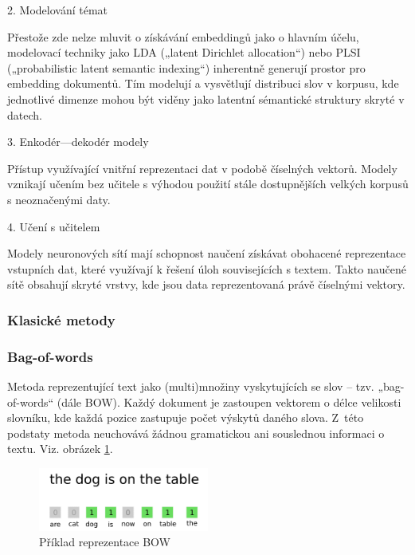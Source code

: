 \documentclass[thesis=M,czech]{FITthesis}[2019/12/23]
\begin{document}
2.	Modelování témat

Přestože zde nelze mluvit o získávání embeddingů jako o hlavním účelu, modelovací techniky jako LDA („latent Dirichlet allocation“) nebo PLSI („probabilistic latent semantic indexing“) inherentně generují prostor pro embedding dokumentů. Tím modelují a vysvětlují distribuci slov v korpusu, kde jednotlivé dimenze mohou být viděny jako latentní sémantické struktury skryté v datech.

3.	Enkodér---dekodér modely

Přístup využívající vnitřní reprezentaci dat v podobě číselných vektorů. Modely vznikají učením bez učitele s výhodou použití stále dostupnějších velkých korpusů s neoznačenými daty.

4.	Učení s učitelem

Modely neuronových sítí mají schopnost naučení získávat obohacené reprezentace vstupních dat, které využívají k řešení úloh souvisejících s textem. Takto naučené sítě obsahují skryté vrstvy, kde jsou data reprezentovaná právě číselnými vektory.

\subsubsection{Klasické metody}
\subsubsection*{Bag-of-words}
Metoda reprezentující text jako (multi)množiny vyskytujících se slov -- tzv. „bag-of-words“ (dále BOW). Každý dokument je zastoupen vektorem o délce velikosti slovníku, kde každá pozice zastupuje počet výskytů daného slova. Z~této podstaty metoda neuchovává žádnou gramatickou ani souslednou informaci o textu. Viz. obrázek \ref{fig:palachy2019BOW}.
\begin{figure}\centering
	\includegraphics[width=0.5\textwidth]{images/palachy2019/palachy2019_BOW.png}
	\caption{Příklad reprezentace BOW\cite{palachy2019}}\label{fig:palachy2019BOW}
\end{figure}
\end{document}
